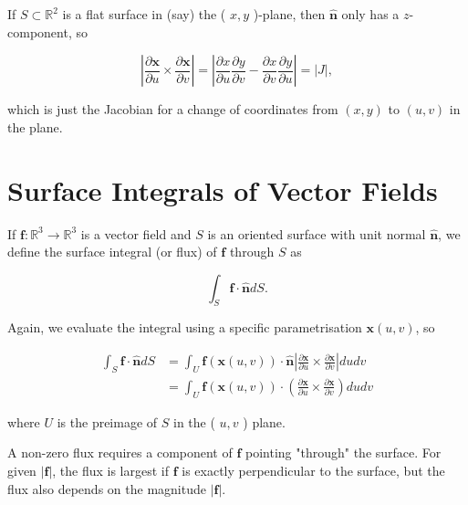 \begin{remark}
  If \(S \subset \mathbb{R}^2\) is a flat surface in (say) the ( \(x, y\) )-plane, then \(\hat{\boldsymbol{n}}\) only has a \(z\)-component, so

\[
\left|\frac{\partial \boldsymbol{x}}{\partial u} \times \frac{\partial \boldsymbol{x}}{\partial v}\right|=\left|\frac{\partial x}{\partial u} \frac{\partial y}{\partial v}-\frac{\partial x}{\partial v} \frac{\partial y}{\partial u}\right|=|J|,
\]

which is just the Jacobian for a change of coordinates from \((x, y)\) to \((u, v)\) in the plane.
\end{remark}

\section{Surface Integrals of Vector Fields}

\begin{definition}[Flux]
  If \(\boldsymbol{f}: \mathbb{R}^3 \rightarrow \mathbb{R}^3\) is a vector field and \(S\) is an oriented surface with unit normal \(\hat{\boldsymbol{n}}\), we define the surface integral (or flux) of \(\boldsymbol{f}\) through \(S\) as

\[
\int_S \boldsymbol{f} \cdot \hat{\boldsymbol{n}} d S .
\]

Again, we evaluate the integral using a specific parametrisation \(\boldsymbol{x}(u, v)\), so

\[
\begin{aligned}
\int_S \boldsymbol{f} \cdot \hat{\boldsymbol{n}} d S & =\int_U \boldsymbol{f}(\boldsymbol{x}(u, v)) \cdot \hat{\boldsymbol{n}}\left|\frac{\partial \boldsymbol{x}}{\partial u} \times \frac{\partial \boldsymbol{x}}{\partial v}\right| d u d v \\
& =\int_U \boldsymbol{f}(\boldsymbol{x}(u, v)) \cdot\left(\frac{\partial \boldsymbol{x}}{\partial u} \times \frac{\partial \boldsymbol{x}}{\partial v}\right) d u d v
\end{aligned}
\]

where \(U\) is the preimage of \(S\) in the ( \(u, v\) ) plane.
\end{definition}

\begin{remark}
  A non-zero flux requires a component of \(\boldsymbol{f}\) pointing "through" the surface. For given \(|\boldsymbol{f}|\), the flux is largest if \(\boldsymbol{f}\) is exactly perpendicular to the surface, but the flux also depends on the magnitude \(|\boldsymbol{f}|\).
\end{remark}

